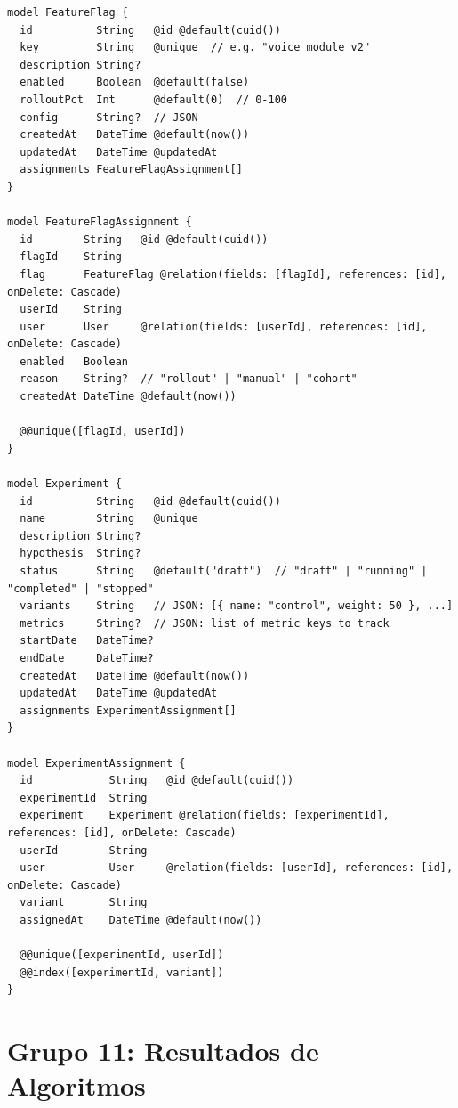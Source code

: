 \begin{lstlisting}[style=sql,caption={Modelos de feature flags y experimentos A/B}]
model FeatureFlag {
  id          String   @id @default(cuid())
  key         String   @unique  // e.g. "voice_module_v2"
  description String?
  enabled     Boolean  @default(false)
  rolloutPct  Int      @default(0)  // 0-100
  config      String?  // JSON
  createdAt   DateTime @default(now())
  updatedAt   DateTime @updatedAt
  assignments FeatureFlagAssignment[]
}

model FeatureFlagAssignment {
  id        String   @id @default(cuid())
  flagId    String
  flag      FeatureFlag @relation(fields: [flagId], references: [id], onDelete: Cascade)
  userId    String
  user      User     @relation(fields: [userId], references: [id], onDelete: Cascade)
  enabled   Boolean
  reason    String?  // "rollout" | "manual" | "cohort"
  createdAt DateTime @default(now())

  @@unique([flagId, userId])
}

model Experiment {
  id          String   @id @default(cuid())
  name        String   @unique
  description String?
  hypothesis  String?
  status      String   @default("draft")  // "draft" | "running" | "completed" | "stopped"
  variants    String   // JSON: [{ name: "control", weight: 50 }, ...]
  metrics     String?  // JSON: list of metric keys to track
  startDate   DateTime?
  endDate     DateTime?
  createdAt   DateTime @default(now())
  updatedAt   DateTime @updatedAt
  assignments ExperimentAssignment[]
}

model ExperimentAssignment {
  id            String   @id @default(cuid())
  experimentId  String
  experiment    Experiment @relation(fields: [experimentId], references: [id], onDelete: Cascade)
  userId        String
  user          User     @relation(fields: [userId], references: [id], onDelete: Cascade)
  variant       String
  assignedAt    DateTime @default(now())

  @@unique([experimentId, userId])
  @@index([experimentId, variant])
}
\end{lstlisting}

\section{Grupo 11: Resultados de Algoritmos}

